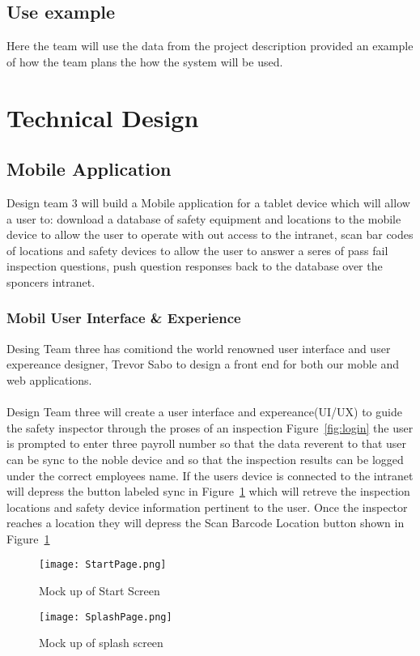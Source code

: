 \documentclass[Letter,11pt]{article}
\begin{document}
	\subsection{Use example}
		Here the team will use the data from the project description provided an example of how the team plans the how the system will be used.
		  
		
\section{Technical Design}
	
	\subsection{Mobile Application}
	Design team 3 will build a Mobile application for a tablet device which will allow a user to: download a database of safety equipment and locations to the mobile device to allow the user to operate with out access to the intranet, scan bar codes of locations and safety devices to allow the user to answer a seres of pass fail inspection questions, push question responses back to the database over the sponcers intranet.
	\subsubsection{Mobil User Interface \& Experience}
	Desing Team three has comitiond the world renowned user interface and user expereance designer, Trevor Sabo to design a front end for both our moble and web applications.\\
	\\
	Design Team three will create a user interface and expereance(UI/UX) to guide the safety inspector through the proses of an inspection Figure~\ref{fig:login} the user is prompted to enter three payroll number so that the data reverent to that user can be sync to the noble device and so that the inspection results can be logged under the correct employees name.
	If the users device is connected to the intranet will depress the button labeled sync in Figure~\ref{fig:splash} which will retreve the inspection locations and safety device information pertinent to the user.
	Once the inspector reaches a location they will depress the Scan Barcode Location button shown in Figure~\ref{fig:splash}
	\begin{figure}[h]
		
		\begin{minipage}{0.5\textwidth}
			\centering
			\texttt{[image: StartPage.png]}
			\caption{\label{fig:login}Mock up of Start Screen}
		\end{minipage}%
		\begin{minipage}{0.5\textwidth}
			\centering
			\texttt{[image: SplashPage.png]}
			\caption{\label{fig:splash}Mock up of splash screen}
		\end{minipage}
	\end{figure}
	
\end{document}
